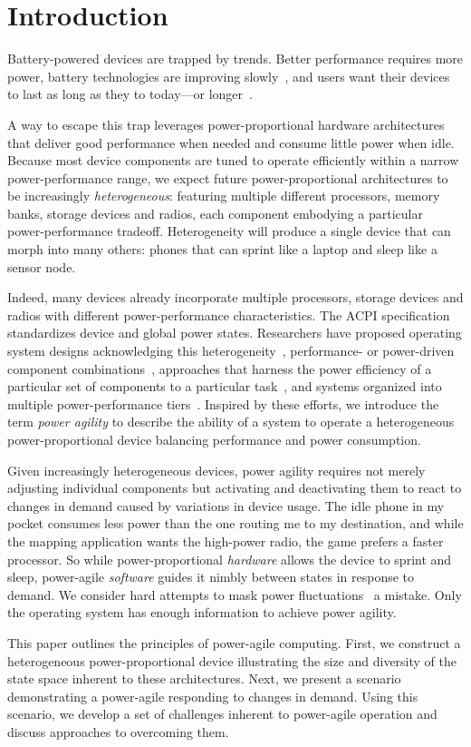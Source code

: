 \section{Introduction}

Battery-powered devices are trapped by trends. Better performance requires more
power, battery technologies are improving
slowly~\cite{economist-batteryhistory}, and users want their devices to last as
long as they to today---or longer~\cite{informationweek-batteries}.

A way to escape this trap leverages power-proportional hardware
architectures~\cite{barroso-energyproportional} that deliver good performance
when needed and consume little power when idle. Because most device
components are tuned to operate efficiently within a narrow power-performance
range, we expect future power-proportional architectures to be increasingly
\textit{heterogeneous}: featuring multiple different processors, memory
banks, storage devices and radios, each component embodying a particular
power-performance tradeoff. Heterogeneity will produce a single device that
can morph into many others: phones that can sprint like a laptop and sleep
like a sensor node.

Indeed, many devices already incorporate multiple processors, storage devices
and radios with different power-performance characteristics. The ACPI
specification~\cite{acpi-standard} standardizes device and global power
states. Researchers have proposed operating system designs acknowledging this
heterogeneity~\cite{baumann-barrelfish}, performance- or power-driven
component combinations~\cite{mogul-hybridnvmdram,aruna-3Gwifi}, approaches
that harness the power efficiency of a particular set of components to a
particular task~\cite{andersen-fawn,szalay-amdahl}, and systems organized
into multiple power-performance tiers~\cite{sorber-turducken}. Inspired by
these efforts, we introduce the term \textit{power agility} to describe the
ability of a system to operate a heterogeneous power-proportional device
balancing performance and power consumption.

Given increasingly heterogeneous devices, power agility requires not merely
adjusting individual components but activating and deactivating them to react
to changes in demand caused by variations in device usage. The idle phone in
my pocket consumes less power than the one routing me to my destination, and
while the mapping application wants the high-power radio, the game prefers a
faster processor. So while power-proportional \textit{hardware} allows the
device to sprint and sleep, power-agile \textit{software} guides it nimbly
between states in response to demand. We consider hard attempts to mask power
fluctuations~\cite{rangan-hpca11} a mistake. Only the operating system has
enough information to achieve power agility.

This paper outlines the principles of power-agile computing. First, we
construct a heterogeneous power-proportional device illustrating the size and
diversity of the state space inherent to these architectures. Next, we
present a scenario demonstrating a power-agile responding to changes in
demand. Using this scenario, we develop a set of challenges inherent to
power-agile operation and discuss approaches to overcoming them.
